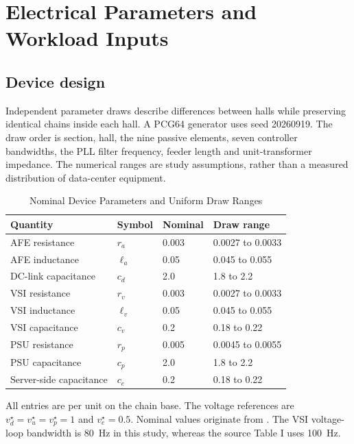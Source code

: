 \section{Electrical Parameters and Workload Inputs}
\subsection{Device design}
Independent parameter draws describe differences between halls while preserving identical chains inside each hall.
A PCG64 generator uses seed 20260919.
The draw order is section, hall, the nine passive elements, seven controller bandwidths, the PLL filter frequency, feeder length and unit-transformer impedance.
The numerical ranges are study assumptions, rather than a measured distribution of data-center equipment.

\begin{table}[H]
\centering
\caption{Nominal Device Parameters and Uniform Draw Ranges}
\begin{tabular}{llll}
\toprule
Quantity & Symbol & Nominal & Draw range\\\midrule
AFE resistance & $r_a$ & 0.003 & 0.0027 to 0.0033\\
AFE inductance & $\ell_a$ & 0.05 & 0.045 to 0.055\\
DC-link capacitance & $c_d$ & 2.0 & 1.8 to 2.2\\
VSI resistance & $r_v$ & 0.003 & 0.0027 to 0.0033\\
VSI inductance & $\ell_v$ & 0.05 & 0.045 to 0.055\\
VSI capacitance & $c_v$ & 0.2 & 0.18 to 0.22\\
PSU resistance & $r_p$ & 0.005 & 0.0045 to 0.0055\\
PSU capacitance & $c_p$ & 2.0 & 1.8 to 2.2\\
Server-side capacitance & $c_e$ & 0.2 & 0.18 to 0.22\\\bottomrule
\end{tabular}
\end{table}
All entries are per unit on the chain base.
The voltage references are $v_d^\star=v_u^\star=v_p^\star=1$ and $v_e^\star=0.5$.
Nominal values originate from \cite{zhao2026dynamic}.
The VSI voltage-loop bandwidth is 80~Hz in this study, whereas the source Table I uses 100~Hz.

